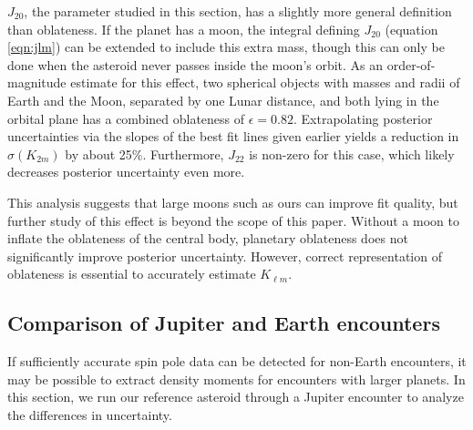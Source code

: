 \documentclass[fleqn,usenatbib]{mnras}
\begin{document}
$J_{20}$, the parameter studied in this section, has a slightly more general definition than oblateness. If the planet has a moon, the integral defining $J_{20}$ (equation \ref{eqn:jlm}) can be extended to include this extra mass, though this can only be done when the asteroid never passes inside the moon's orbit. As an order-of-magnitude estimate for this effect, two spherical objects with masses and radii of Earth and the Moon, separated by one Lunar distance, and both lying in the orbital plane has a combined oblateness of $\epsilon = 0.82$. Extrapolating posterior uncertainties via the slopes of the best fit lines given earlier yields a reduction in $\sigma(K_{2m})$ by about 25\%. Furthermore, $J_{22}$ is non-zero for this case, which likely decreases posterior uncertainty even more.

This analysis suggests that large moons such as ours can improve fit quality, but further study of this effect is beyond the scope of this paper. Without a moon to inflate the oblateness of the central body, planetary oblateness does not significantly improve posterior uncertainty. However, correct representation of oblateness is essential to accurately estimate $K_{\ell m}$.



\subsection{Comparison of Jupiter and Earth encounters}
\label{sec:jupiter-earth}

If sufficiently accurate spin pole data can be detected for non-Earth encounters, it may be possible to extract density moments for encounters with larger planets. In this section, we run our reference asteroid through a Jupiter encounter to analyze the differences in uncertainty.
\end{document}
